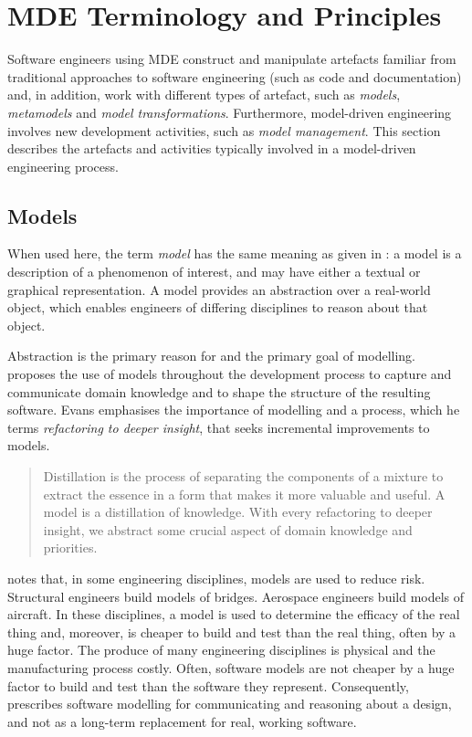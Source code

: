 
\section{MDE Terminology and Principles}
\label{sec:mde_terms}
Software engineers using MDE construct and manipulate artefacts familiar from traditional approaches to software engineering (such as code and documentation) and, in addition, work with different types of artefact, such as \emph{models}, \emph{metamodels} and \emph{model transformations}. Furthermore, model-driven engineering involves new development activities, such as \emph{model management}. This section describes the artefacts and activities typically involved in a model-driven engineering process.

\subsection{Models} %
When used here, the term \emph{model} has the same meaning as given in \cite{kolovos06eol}: a model is a description of a phenomenon of interest, and may have either a textual or graphical representation. A model provides an abstraction over a real-world object, which enables engineers of differing disciplines to reason about that object.

Abstraction is the primary reason for and the primary goal of modelling. \cite{evans04domain} proposes the use of models throughout the development process to capture and communicate domain knowledge and to shape the structure of the resulting software. Evans emphasises the importance of modelling and a process, which he terms \emph{refactoring to deeper insight}, that seeks incremental improvements to models.

\begin{quote}
Distillation is the process of separating the components of a mixture to extract the essence in a form that makes it more valuable and useful. A model is a distillation of knowledge. With every refactoring to deeper insight, we abstract some crucial aspect of domain knowledge and priorities. \cite[pg397]{evans04domain}
\end{quote}

\cite[ch14]{martin06agile} notes that, in some engineering disciplines, models are used to reduce risk. Structural engineers build models of bridges. Aerospace engineers build models of aircraft. In these disciplines, a model is used to determine the efficacy of the real thing and, moreover, is cheaper to build and test than the real thing, often by a huge factor. The produce of many engineering disciplines is physical and the manufacturing process costly. Often, software models are not cheaper by a huge factor to build and test than the software they represent. Consequently, \cite[ch14]{martin06agile} prescribes software modelling for communicating and reasoning about a design, and not as a long-term replacement for real, working software.

